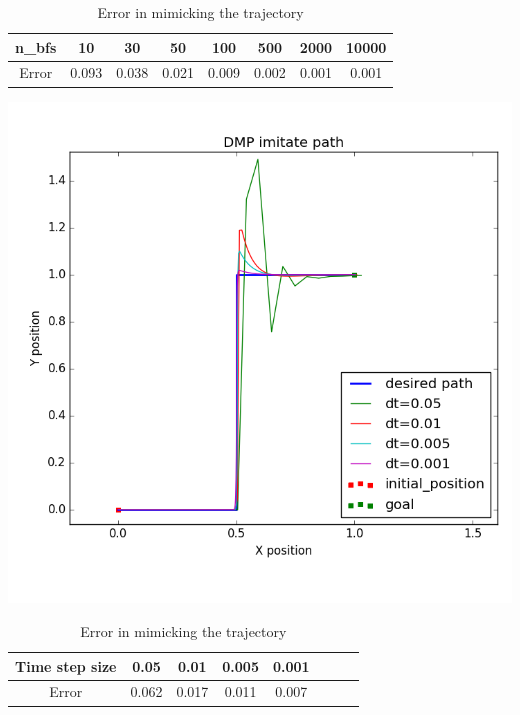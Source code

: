 \documentclass{beamer}
\begin{document}
	\begin{frame}
		
		\begin{center}
			\begin{table}[H]
				\begin{tabular}{| c | c | c | c | c | c | c | c |}	
					\hline
					n\_bfs & 10 & 30 & 50 & 100 & 500 & 2000 & 10000\\       
					\hline
					Error & 0.093 & 0.038 & 0.021 & 0.009 & 0.002 & 0.001 & 0.001\\
					\hline
				\end{tabular}
				\caption{Error in mimicking the trajectory}
			\end{table}\label{_n_bfs_e}
		\end{center}
	\end{frame}
	
	\begin{frame}
		\centering
		\includegraphics[scale=0.45]{images/dt_}
	\end{frame}
	
	\begin{frame}
		\begin{center}
			\begin{table}[H]
				\centering
				\begin{tabular}{| c | c | c | c | c | c | c | c |}	
					\hline
					Time step size & 0.05 & 0.01 & 0.005 & 0.001 \\       
					\hline
					Error & 0.062 & 0.017 & 0.011 & 0.007 \\
					\hline
				\end{tabular}
				\caption{Error in mimicking the trajectory}
			\end{table}\label{_dt_e}
		\end{center}
	\end{frame}
	
\end{document}
